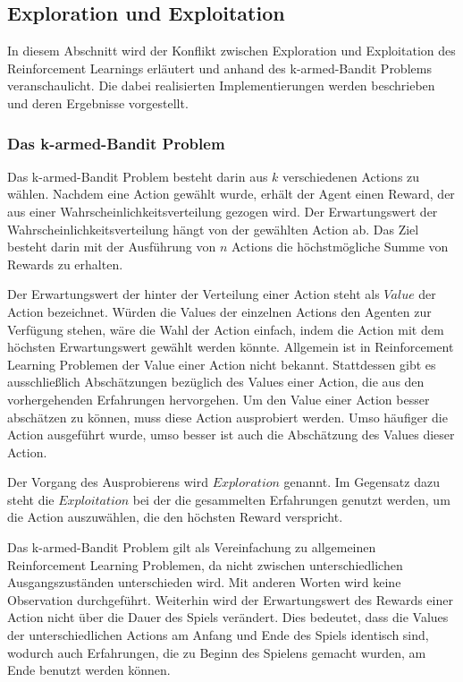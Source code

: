 \documentclass[11pt]{scrartcl}
\begin{document}
\subsection{Exploration und Exploitation}
In diesem Abschnitt wird der Konflikt zwischen Exploration und Exploitation des
Reinforcement Learnings erläutert und anhand des k-armed-Bandit Problems veranschaulicht.
Die dabei realisierten Implementierungen werden beschrieben und deren Ergebnisse
vorgestellt.

\subsubsection{Das k-armed-Bandit Problem}
Das k-armed-Bandit Problem besteht darin aus $k$ verschiedenen Actions zu wählen.
Nachdem eine Action gewählt wurde, erhält der Agent einen Reward, der aus einer
Wahrscheinlichkeitsverteilung gezogen wird. Der Erwartungswert der
Wahrscheinlichkeitsverteilung hängt von der gewählten Action ab. Das Ziel besteht darin
mit der Ausführung von $n$ Actions die höchstmögliche Summe von Rewards zu erhalten.

Der Erwartungswert der hinter der Verteilung einer Action steht als $Value$ der Action
bezeichnet. Würden die Values der einzelnen Actions den Agenten zur Verfügung stehen, wäre die 
Wahl der Action einfach, indem die Action mit dem höchsten Erwartungswert gewählt werden 
könnte. Allgemein ist in Reinforcement Learning Problemen der Value einer Action nicht bekannt.
Stattdessen gibt es ausschließlich Abschätzungen bezüglich des Values einer Action, die aus den
vorhergehenden Erfahrungen hervorgehen. Um den Value einer Action besser abschätzen zu können,
muss diese Action ausprobiert werden. Umso häufiger die Action ausgeführt wurde, umso besser
ist auch die Abschätzung des Values dieser Action.

Der Vorgang des Ausprobierens wird $Exploration$ genannt. Im Gegensatz dazu steht die
$Exploitation$ bei der die gesammelten Erfahrungen genutzt werden, um die Action
auszuwählen, die den höchsten Reward verspricht.

Das k-armed-Bandit Problem gilt als Vereinfachung zu allgemeinen Reinforcement Learning
Problemen, da nicht zwischen unterschiedlichen Ausgangszuständen unterschieden wird. Mit
anderen Worten wird keine Observation durchgeführt. Weiterhin wird der Erwartungswert des
Rewards einer Action nicht über die Dauer des Spiels verändert. Dies bedeutet, dass die
Values der unterschiedlichen Actions am Anfang und Ende des Spiels identisch sind, wodurch
auch Erfahrungen, die zu Beginn des Spielens gemacht wurden, am Ende benutzt werden
können.
\end{document}
